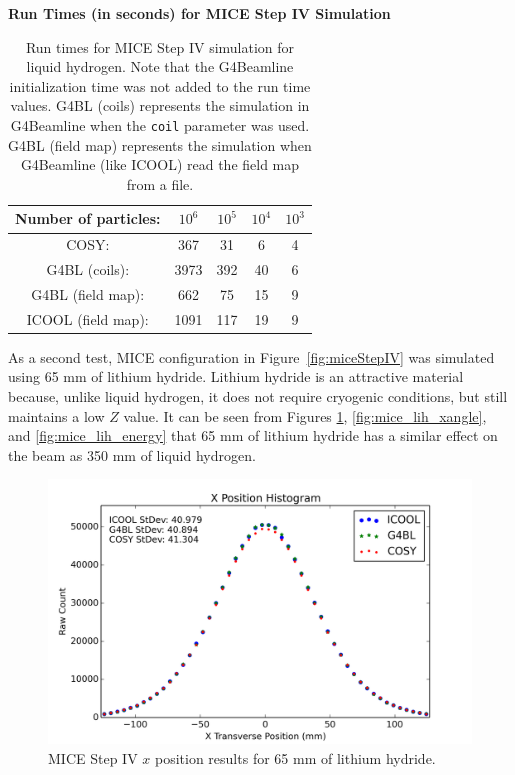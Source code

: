 \begin{table}
\caption*{\textbf{Run Times (in seconds) for MICE Step IV Simulation}}
\begin{center}
\begin{tabularx}{0.55\textwidth}{ccccc}
\hline \hline
Number of particles: & $10^6$ & $10^5$ & $10^4$ & $10^3$\\
\hline
COSY: & 367 & 31 & 6 & 4\vspace{-12pt}\\
G4BL (coils): & 3973 & 392 & 40 & 6\vspace{-12pt}\\
G4BL (field map): & 662 & 75 & 15 & 9\vspace{-12pt}\\
ICOOL (field map): & 1091 & 117 & 19 & 9\\
\hline
\end{tabularx}
\end{center}
\caption[Run times for MICE Step IV simulation.]{Run times for MICE Step IV simulation for liquid hydrogen. Note that the G4Beamline initialization time was not added to the run time values. G4BL (coils) represents the simulation in G4Beamline when the \texttt{coil} parameter was used. G4BL (field map) represents the simulation when G4Beamline (like ICOOL) read the field map from a file.}
\label{tbl:mice_times}
\end{table}

As a second test, MICE configuration in Figure~\ref{fig:miceStepIV} was simulated using 65 mm of lithium hydride. Lithium hydride is an attractive material because, unlike liquid hydrogen, it does not require cryogenic conditions, but still maintains a low $Z$ value. It can be seen from Figures \ref{fig:mice_lih_x}, \ref{fig:mice_lih_xangle}, and \ref{fig:mice_lih_energy} that 65 mm of lithium hydride has a similar effect on the beam as 350 mm of liquid hydrogen.

\begin{figure}[H]
  \centering
    \includegraphics[width=\textwidth]{MICE data/LiH/x} 
  \caption{MICE Step IV $x$ position results for 65 mm of lithium hydride.}
  \label{fig:mice_lih_x}
\end{figure}

